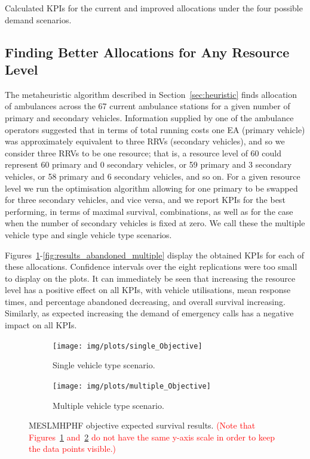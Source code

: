 \documentclass[numbers,webpdf,imaman]{ima-authoring-template}%
\begin{document}
\begin{table}
\resizebox{\textwidth}{!}{%
%
}
\caption{Calculated KPIs for the current and improved allocations under the
four possible demand scenarios.}
\label{tbl:current_optimal_compare}
\end{table}


\subsection{Finding Better Allocations for Any Resource Level}\label{sec:vehicle_numbers}
The metaheuristic algorithm described in Section~\ref{sec:heuristic} finds
allocation of ambulances across the 67 current ambulance stations for a given
number of primary and secondary vehicles. Information supplied by one of the
ambulance operators suggested that in terms of total running costs one EA
(primary vehicle) was approximately equivalent to three RRVs (secondary
vehicles), and so we consider three RRVs to be one resource; that is, a
resource level of 60 could represent 60 primary and 0 secondary vehicles, or
59 primary and 3 secondary vehicles, or 58 primary and 6 secondary vehicles,
and so on. For a given resource level we run the optimisation algorithm allowing
for one primary to be swapped for three secondary vehicles, and vice versa,
and we report KPIs for the best performing, in terms of maximal
survival, combinations, as well as for the case when the number of secondary
vehicles is fixed at zero. We call these the multiple vehicle type and single
vehicle type scenarios.

Figures~\ref{fig:results_objective_single}-\ref{fig:results_abandoned_multiple}
display the obtained KPIs for each of these allocations. Confidence intervals
over the eight replications were too small to display on the plots. It can
immediately be seen that increasing the resource level has a positive effect on
all KPIs, with vehicle utilisations, mean response times, and percentage
abandoned decreasing, and overall survival increasing. Similarly, as expected
increasing the demand of emergency calls has a negative impact on all KPIs.

\begin{figure}[htb!]
\begin{center}
\begin{subfigure}{0.4\textwidth}
\texttt{[image: img/plots/single\_Objective]}
\caption{Single vehicle type scenario.}
\label{fig:results_objective_single}
\end{subfigure}
\begin{subfigure}{0.4\textwidth}
\texttt{[image: img/plots/multiple\_Objective]}
\caption{Multiple vehicle type scenario.}
\label{fig:results_objective_multiple}
\end{subfigure}
\end{center}
\caption{MESLMHPHF objective expected survival results. \textcolor{red}{(Note that Figures~\ref{fig:results_objective_single} and~\ref{fig:results_objective_multiple} do not have the same y-axis scale in order to keep the data points visible.)}}
\label{fig:results_objective}
\end{figure}
\end{document}
